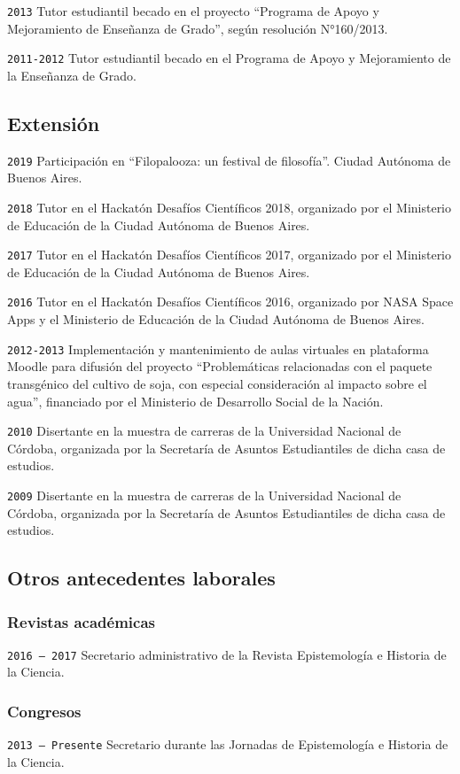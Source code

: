 \documentclass[]{article}
\begin{document}
\texttt{2013} Tutor estudiantil becado en el proyecto ``Programa de
Apoyo y Mejoramiento de Enseñanza de Grado'', según resolución
N°160/2013.

\texttt{2011-2012} Tutor estudiantil becado en el Programa de Apoyo y
Mejoramiento de la Enseñanza de Grado.

\hypertarget{extensiuxf3n}{%
\subsection{Extensión}\label{extensiuxf3n}}

\texttt{2019} Participación en ``Filopalooza: un festival de
filosofía''. Ciudad Autónoma de Buenos Aires.

\texttt{2018} Tutor en el Hackatón Desafíos Científicos 2018, organizado
por el Ministerio de Educación de la Ciudad Autónoma de Buenos Aires.

\texttt{2017} Tutor en el Hackatón Desafíos Científicos 2017, organizado
por el Ministerio de Educación de la Ciudad Autónoma de Buenos Aires.

\texttt{2016} Tutor en el Hackatón Desafíos Científicos 2016, organizado
por NASA Space Apps y el Ministerio de Educación de la Ciudad Autónoma
de Buenos Aires.

\texttt{2012-2013} Implementación y mantenimiento de aulas virtuales en
plataforma Moodle para difusión del proyecto ``Problemáticas
relacionadas con el paquete transgénico del cultivo de soja, con
especial consideración al impacto sobre el agua'', financiado por el
Ministerio de Desarrollo Social de la Nación.

\texttt{2010} Disertante en la muestra de carreras de la Universidad
Nacional de Córdoba, organizada por la Secretaría de Asuntos
Estudiantiles de dicha casa de estudios.

\texttt{2009} Disertante en la muestra de carreras de la Universidad
Nacional de Córdoba, organizada por la Secretaría de Asuntos
Estudiantiles de dicha casa de estudios.

\hypertarget{otros-antecedentes-laborales}{%
\subsection{Otros antecedentes
laborales}\label{otros-antecedentes-laborales}}

\hypertarget{revistas-acaduxe9micas}{%
\subsubsection{Revistas académicas}\label{revistas-acaduxe9micas}}

\texttt{2016\ –\ 2017} Secretario administrativo de la Revista
Epistemología e Historia de la Ciencia.

\hypertarget{congresos}{%
\subsubsection{Congresos}\label{congresos}}

\texttt{2013\ –\ Presente} Secretario durante las Jornadas de
Epistemología e Historia de la Ciencia.
\end{document}
